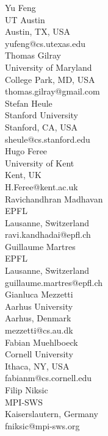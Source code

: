 \documentclass[a4paper,UKenglish]{dartsmaster}
\begin{document}
\begin{participants}
\participant	Yu Feng	\\	UT Austin	\\	Austin, TX, USA	\\	yufeng@cs.utexas.edu	\\

\participant	Thomas Gilray	\\	University of Maryland	\\	College Park, MD, USA	\\	thomas.gilray@gmail.com	\\

\participant	Stefan Heule	\\	Stanford University	\\	Stanford, CA, USA	\\	sheule@cs.stanford.edu	\\

\participant	Hugo Feree	\\	University of Kent	\\	Kent, UK	\\	H.Feree@kent.ac.uk	\\

\participant	Ravichandhran Madhavan	\\	EPFL	\\	Lausanne, Switzerland	\\	ravi.kandhadai@epfl.ch	\\

\participant	Guillaume Martres	\\	EPFL	\\	Lausanne, Switzerland	\\	guillaume.martres@epfl.ch	\\

\participant	Gianluca Mezzetti	\\	Aarhus University	\\	Aarhus, Denmark	\\	mezzetti@cs.au.dk	\\

\participant	Fabian Muehlboeck	\\	Cornell University	\\	Ithaca, NY, USA	\\	fabianm@cs.cornell.edu	\\

\participant	Filip Niksic	\\	MPI-SWS	\\	Kaiserslautern, Germany	\\	fniksic@mpi-sws.org	\\


\end{participants}
\end{document}
